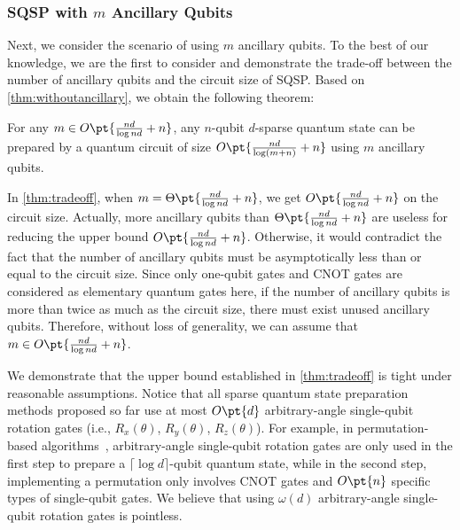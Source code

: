 \documentclass[a4paper,UKenglish,cleveref, autoref, thm-restate]{lipics-v2021}
\newcommand{\bo}{O\pt}
\newcommand{\ta}{\Theta\pt}
\begin{document}
\subsubsection{\texorpdfstring{SQSP with $m$ Ancillary Qubits}{SQSP with m Ancillary Qubits}} 
Next, we consider the scenario of using $m$ ancillary qubits. To the best of our knowledge, we are the first to consider and demonstrate the trade-off between the number of ancillary qubits and the circuit size of SQSP. Based on \cref{thm:withoutancillary}, we obtain the following theorem:

\begin{theorem}\label{thm:tradeoff}
   For any $m \in \bo{\frac{nd}{\log nd}+n}$, any $n$-qubit $d$-sparse quantum state can be prepared by a quantum circuit of size $\bo{\frac{nd}{\log (m+n)} + n}$ using $m$ ancillary qubits.
\end{theorem}

\begin{remark}\label{remark:ub-on-ancillary}
    In \cref{thm:tradeoff},   when $m = \ta{\frac{nd}{\log nd}+n}$, we get  $\bo{\frac{nd}{\log nd}+n}$ on the circuit size. Actually, more ancillary qubits than $\ta{\frac{nd}{\log nd}+n}$ are useless for reducing the upper bound $\bo{\frac{nd}{\log nd}+n}$. Otherwise, it would contradict the fact that the number of ancillary qubits must be asymptotically less than or equal to the circuit size. Since only one-qubit gates and CNOT gates are considered as elementary quantum gates here, if the number of ancillary qubits is more than twice as much as the circuit size, there must exist unused ancillary qubits. Therefore, without loss of generality, we can assume that $m \in \bo{\frac{nd}{\log nd}+n}$.
\end{remark}


We demonstrate that the upper bound established in \cref{thm:tradeoff} is tight under reasonable assumptions. 
Notice that all sparse quantum state preparation methods proposed so far use at most $\bo{d}$ arbitrary-angle single-qubit rotation gates (i.e., $R_x(\theta)$, $R_y(\theta)$, $R_z(\theta)$). For example, in permutation-based  algorithms~\cite{malvetti2021quantum, ramacciotti2023simple}, arbitrary-angle single-qubit rotation gates are only used in the first step to prepare a $ \lceil\log d\rceil $-qubit quantum state, while in the second step, implementing a permutation only involves CNOT gates and $\bo{n}$ specific types of single-qubit gates. We believe that using $\omega(d)$ arbitrary-angle single-qubit rotation gates is pointless. 
\end{document}
